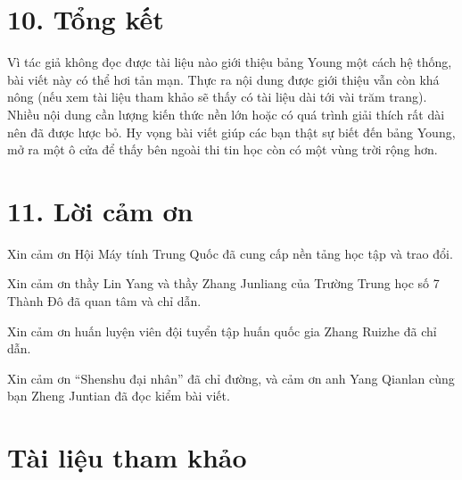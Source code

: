 \documentclass[11pt]{article}
\begin{document}
\section*{10. Tổng kết}

Vì tác giả không đọc được tài liệu nào giới thiệu bảng Young một cách hệ
thống, bài viết này có thể hơi tản mạn. Thực ra nội dung được giới thiệu vẫn
còn khá nông (nếu xem tài liệu tham khảo sẽ thấy có tài liệu dài tới vài trăm
trang). Nhiều nội dung cần lượng kiến thức nền lớn hoặc có quá trình giải
thích rất dài nên đã được lược bỏ. Hy vọng bài viết giúp các bạn thật sự biết
đến bảng Young, mở ra một ô cửa để thấy bên ngoài thi tin học còn có một vùng
trời rộng hơn.

\section*{11. Lời cảm ơn}

Xin cảm ơn Hội Máy tính Trung Quốc đã cung cấp nền tảng học tập và trao đổi.

Xin cảm ơn thầy Lin Yang và thầy Zhang Junliang của Trường Trung học số 7
Thành Đô đã quan tâm và chỉ dẫn.

Xin cảm ơn huấn luyện viên đội tuyển tập huấn quốc gia Zhang Ruizhe đã chỉ
dẫn.

Xin cảm ơn ``Shenshu đại nhân'' đã chỉ đường, và cảm ơn anh Yang Qianlan cùng
bạn Zheng Juntian đã đọc kiểm bài viết.

\section*{Tài liệu tham khảo}
\end{document}
